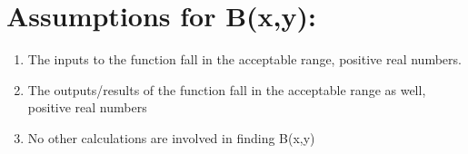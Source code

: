 \documentclass{article}
\begin{document}

\Large\section*{Assumptions for B(x,y):}

\begin{enumerate}
    \item The inputs to the function fall in the acceptable range, positive real numbers.
    \item The outputs/results of the function fall in the acceptable range as well, positive real numbers
    \item No other calculations are involved in finding B(x,y)
\end{enumerate}
\end{document}
